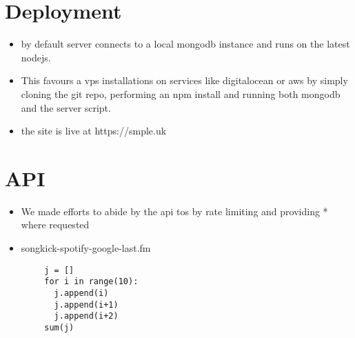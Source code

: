 \documentclass[10pt]{article}
\begin{document}
    \section{Deployment}
        \begin{itemize}
            \item by default server connects to a local mongodb instance and runs on the latest nodejs.
            \item This favours a vps installations on services like digitalocean or aws by simply cloning the git repo, performing an npm install and running both mongodb and the server script.
            \item the site is live at https://smple.uk
        \end{itemize}

    \section{API}
        \begin{itemize}
            \item We made efforts to abide by the api tos by rate limiting and providing * where requested
            \item songkick-spotify-google-last.fm
        \end{itemize}


    \begin{verbatim}
        j = []
        for i in range(10):
          j.append(i)
          j.append(i+1)
          j.append(i+2)
        sum(j)
    \end{verbatim}




\end{document}
